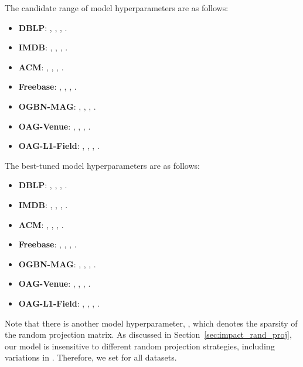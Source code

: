 \documentclass[lettersize,journal]{IEEEtran}
\begin{document}
The candidate range of model hyperparameters are as follows:
\begin{itemize}
\item \textbf{DBLP}: , , , .
\item \textbf{IMDB}: , , , .
\item \textbf{ACM}: , , , .
\item \textbf{Freebase}: , , , .
\item \textbf{OGBN-MAG}: , , , .
\item \textbf{OAG-Venue}: , , , .
\item \textbf{OAG-L1-Field}: , , , .
\end{itemize}


The best-tuned model hyperparameters are as follows:
\begin{itemize}
\item \textbf{DBLP}: , , , .
\item \textbf{IMDB}: , , , .
\item \textbf{ACM}: , , , .
\item \textbf{Freebase}: , , , .
\item \textbf{OGBN-MAG}: , , , .
\item \textbf{OAG-Venue}: , , , .
\item \textbf{OAG-L1-Field}: , , , .
\end{itemize}
Note that there is another model hyperparameter, , which denotes the sparsity of the random projection matrix.
As discussed in Section~\ref{sec:impact_rand_proj}, our model is insensitive to different random projection strategies, including variations in .
Therefore, we set  for all datasets.
\end{document}
